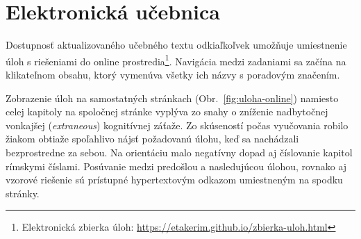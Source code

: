 \section{Elektronická učebnica}
Dostupnosť aktualizovaného učebného textu odkiaľkoľvek umožňuje umiestnenie úloh s riešeniami do online prostredia\footnote{Elektronická zbierka úloh: \url{https://etakerim.github.io/zbierka-uloh.html}}. Navigácia medzi zadaniami sa začína na klikateľnom obsahu, ktorý vymenúva všetky ich názvy s poradovým značením.

Zobrazenie úloh na samostatných stránkach (Obr.~\ref{fig:uloha-online}) namiesto celej kapitoly na spoločnej stránke vyplýva zo snahy o zníženie nadbytočnej vonkajšej (\emph{extraneous}) kognitívnej záťaže. Zo skúseností počas vyučovania robilo žiakom obtiaže spoľahlivo nájsť požadovanú úlohu, keď sa nachádzali bezprostredne za sebou. Na orientáciu malo negatívny dopad aj číslovanie kapitol rímskymi číslami. Posúvanie medzi predošlou a nasledujúcou úlohou, rovnako aj vzorové riešenie sú prístupné hypertextovým odkazom umiestneným na spodku stránky.

